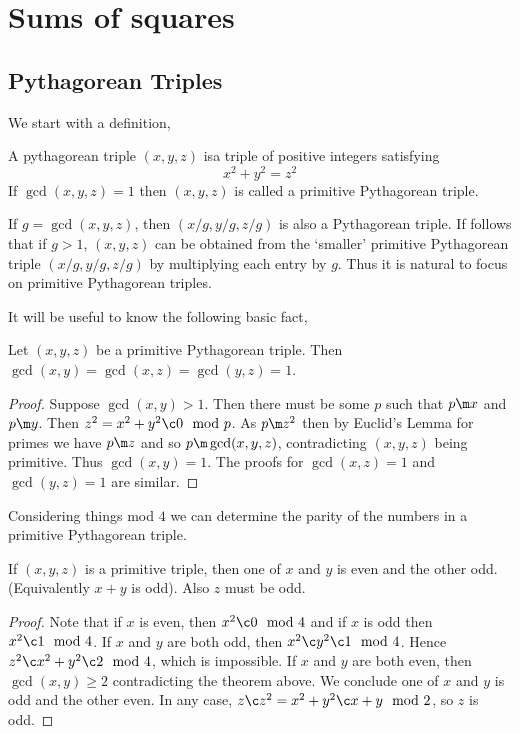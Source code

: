 
\section{Sums of squares}
\subsection{Pythagorean Triples}

We start with a definition,
\begin{ndefi}
  A pythagorean triple $(x, y, z)$ isa triple of positive integers satisfying
  $$ x^2 + y^2 = z^2 $$
  If $\gcd(x, y, z) = 1$ then $(x, y, z)$ is called a primitive Pythagorean triple.
\end{ndefi}

\begin{remark}
   If $g = \gcd(x, y, z)$, then $(x/g, y/g, z/g)$ is also a Pythagorean triple. If follows that if $g > 1$, $(x, y, z)$ can be obtained from the `smaller' primitive Pythagorean triple $(x/g, y/g, z/g)$ by multiplying each entry by $g$. Thus it is natural to focus on primitive Pythagorean triples.
\end{remark}

It will be useful to know the following basic fact,
\begin{nthm}[]
  Let $(x, y, z)$ be a primitive Pythagorean triple. Then $\gcd(x, y) = \gcd(x, z) = \gcd(y, z) = 1$.
\end{nthm}
\begin{proof}
  Suppose $\gcd(x, y) > 1$. Then there must be some $p$ such that $p \m x$ and $p \m y$. Then $z^2 = x^2 + y^2 \c 0 \mod p$. As $p \m z^2$ then by Euclid's Lemma for primes we have $p \m z$ and so $p \m \gcd(x, y, z)$, contradicting $(x, y, z)$ being primitive. Thus $\gcd(x, y) = 1$. The proofs for $\gcd(x, z) = 1$ and $\gcd(y, z) = 1$ are similar.
\end{proof}

\noindent
Considering things mod $4$ we can determine the parity of the numbers in a primitive Pythagorean triple.
\begin{nthm}
  If $(x, y, z)$ is a primitive triple, then one of $x$ and $y$ is even and the other odd. (Equivalently $x + y$ is odd). Also $z$ must be odd.
\end{nthm}
\begin{proof}
  Note that if $x$ is even, then $x^2 \c 0 \mod 4$ and if $x$ is odd then $x^2 \c 1 \mod 4$. If $x$ and $y$ are both odd, then $x^2 \c y^2 \c 1 \mod 4$. Hence $z^2 \c x^2 + y^2 \c 2 \mod 4$, which is impossible. If $x$ and $y$ are both even, then $\gcd(x, y) \ge 2$ contradicting the theorem above.
  We conclude one of $x$ and $y$ is odd and the other even. In any case, $z \c z^2 = x^2 + y^2 \c x + y \mod 2$, so $z$ is odd.
\end{proof}

